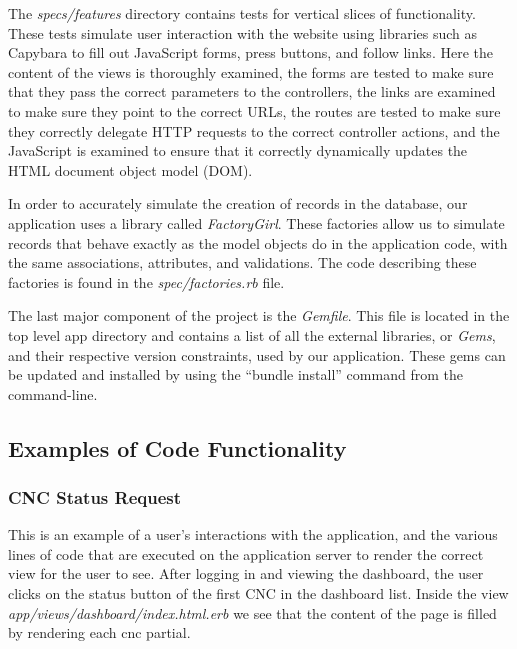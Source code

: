 \documentclass[12pt,letterpaper,titlepage]{article}
\begin{document}
The \textit{specs/features} directory contains tests for vertical slices of functionality. These tests simulate user interaction with the website using libraries such as Capybara to fill out JavaScript forms, press buttons, and follow links. Here the content of the views is thoroughly examined, the forms are tested to make sure that they pass the correct parameters to the controllers, the links are examined to make sure they point to the correct URLs, the routes are tested to make sure they correctly delegate HTTP requests to the correct controller actions, and the JavaScript is examined to ensure that it correctly dynamically updates the HTML document object model (DOM).

In order to accurately simulate the creation of records in the database, our application uses a library called \textit{FactoryGirl}. These factories allow us to simulate records that behave exactly as the model objects do in the application code, with the same associations, attributes, and validations. The code describing these factories is found in the \textit{spec/factories.rb} file.

The last major component of the project is the \textit{Gemfile}. This file is located in the top level app directory and contains a list of all the external libraries, or \textit{Gems}, and their respective version constraints, used by our application. These gems can be updated and installed by using the ``bundle install'' command from the command-line.

\subsection{Examples of Code Functionality} \label{doc:ExamplesofCodeFunctionality}

\subsubsection{CNC Status Request} \label{doc:CNCStatusRequest}
This is an example of a user’s interactions with the application, and the various lines of code that are executed on the application server to render the correct view for the user to see.
After logging in and viewing the dashboard, the user clicks on the status button of the first CNC in the dashboard list. Inside the view \textit{app/views/dashboard/index.html.erb} we see that the content of the page is filled by rendering each cnc partial.


\end{document}
